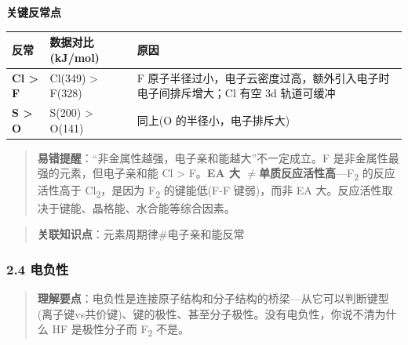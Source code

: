 \documentclass[a4paper,11pt]{ctexart}
\newcounter{none}
\newcommand{\箭}{\ensuremath{\rightarrow}}
\newcommand{\左箭}{\ensuremath{\leftarrow}}
\newcommand{\上箭}{\ensuremath{\uparrow}}
\newcommand{\下箭}{\ensuremath{\downarrow}}
\newcommand{\衡}{\ensuremath{\rightleftharpoons}}
\newcommand{\双箭}{\ensuremath{\leftrightarrow}}
\newcommand{\约等于}{\ensuremath{\approx}}
\newcommand{\小于等于}{\ensuremath{\leq}}
\newcommand{\大于等于}{\ensuremath{\geq}}
\newcommand{\不等于}{\ensuremath{\neq}}
\newcommand{\西格马}{\ensuremath{\sigma}}
\newcommand{\派}{\ensuremath{\pi}}
\begin{document}
\textbf{关键反常点}

{\def\LTcaptype{none} %
\begin{longtable}[]{@{}
  >{\raggedright\arraybackslash}p{}
  >{\raggedright\arraybackslash}p{}
  >{\raggedright\arraybackslash}p{}@{}}
\toprule\noalign{}
\begin{minipage}[b]{\linewidth}\raggedright
反常
\end{minipage} & \begin{minipage}[b]{\linewidth}\raggedright
数据对比 (kJ/mol)
\end{minipage} & \begin{minipage}[b]{\linewidth}\raggedright
原因
\end{minipage} \\
\midrule\noalign{}
\endhead
\bottomrule\noalign{}
\endlastfoot
\textbf{Cl \textgreater{} F} & Cl(349) \textgreater{} F(328) & F 原子半径过小，电子云密度过高，额外引入电子时电子间排斥增大；Cl 有空 3d 轨道可缓冲 \\
\textbf{S \textgreater{} O} & S(200) \textgreater{} O(141) & 同上(O 的半径小，电子排斥大) \\
\end{longtable}
}

\begin{quote}
\textbf{易错提醒}：``非金属性越强，电子亲和能越大''不一定成立。F 是非金属性最强的元素，但电子亲和能 Cl \textgreater{} F。\textbf{EA 大 \不等于 单质反应活性高}---F\textsubscript{2} 的反应活性高于 Cl\textsubscript{2}，是因为 F\textsubscript{2} 的键能低(F-F 键弱)，而非 EA 大。反应活性取决于键能、晶格能、水合能等综合因素。
\end{quote}

\begin{quote}
\textbf{关联知识点}：元素周期律\#电子亲和能反常
\end{quote}

\subsubsection{2.4 电负性}\label{ux7535ux8d1fux6027}

\begin{quote}
\textbf{理解要点}：电负性是连接原子结构和分子结构的桥梁---从它可以判断键型(离子键vs共价键)、键的极性、甚至分子极性。没有电负性，你说不清为什么 HF 是极性分子而 F\textsubscript{2} 不是。
\end{quote}
\end{document}
